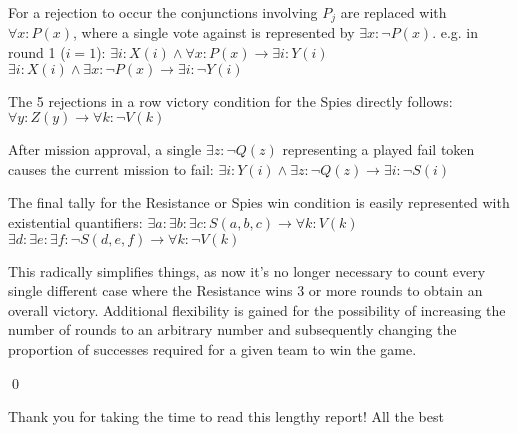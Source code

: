 \documentclass[pdftex,10pt,a4paper]{article}
\numberwithin{equation}{section} %
\begin{document}
For a rejection to occur the conjunctions involving $P_j$ are replaced with \indent$\forall x:P(x)$, where a single vote against is represented by $\exists x: \neg P(x)$. \newline \newline
\indent e.g. in round 1 ($i=1$):\newline
\indent$\exists i:X(i) \land \forall x:P(x) \rightarrow \exists i:Y(i)$\newline
\indent$\exists i:X(i) \land \exists x:\neg P(x) \rightarrow \exists i:\neg Y(i)$\newline

The 5 rejections in a row victory condition for the Spies directly follows:\newline
\indent$\forall y:Z(y) \rightarrow \forall k:\neg V(k)$\newline

After mission approval, a single $\exists z: \neg Q(z)$ representing a played fail token \indent causes the current mission to fail:\newline 
\indent$\exists i:Y(i)\land \exists z:\neg Q(z) \rightarrow \exists i:\neg S(i)$\newline

The final tally for the Resistance or Spies win condition is easily represented \indent with existential quantifiers:\newline
\indent$\exists a: \exists b: \exists c: S(a,b,c) \rightarrow \forall k:V(k)$\newline
\indent$\exists d: \exists e: \exists f: \neg S(d,e,f) \rightarrow \forall k:\neg V(k)$\newline

This radically simplifies things, as now it's no longer necessary to count every single different case where the Resistance wins 3 or more rounds to obtain an overall victory. Additional flexibility is gained for the possibility of increasing the number of rounds to an arbitrary number and subsequently changing the proportion of successes required for a given team to win the game.

\qed 

Thank you for taking the time to read this lengthy report! All the best

\end{document}
